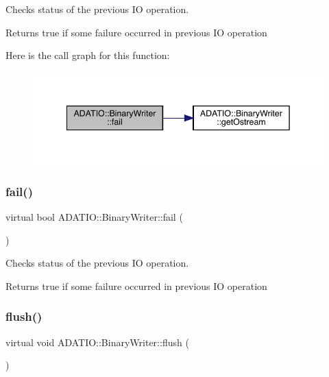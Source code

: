 Checks status of the previous IO operation. 

\begin{DoxyReturn}{Returns}
true if some failure occurred in previous IO operation 
\end{DoxyReturn}
Here is the call graph for this function\+:\nopagebreak
\begin{figure}[H]
\begin{center}
\leavevmode
\includegraphics[width=342pt]{db/dee/classADATIO_1_1BinaryWriter_a68812ccfcedfce8b5459b1327e9b03cb_cgraph}
\end{center}
\end{figure}
\mbox{\label{classADATIO_1_1BinaryWriter_af549adfdbe2c671008ad58952b34b06e}} 
\subsubsection{\texorpdfstring{fail()}{fail()}\hspace{0.1cm}{\footnotesize\ttfamily [2/2]}}
{\footnotesize\ttfamily virtual bool A\+D\+A\+T\+I\+O\+::\+Binary\+Writer\+::fail (\begin{DoxyParamCaption}{ }\end{DoxyParamCaption})\hspace{0.3cm}{\ttfamily [virtual]}}



Checks status of the previous IO operation. 

\begin{DoxyReturn}{Returns}
true if some failure occurred in previous IO operation 
\end{DoxyReturn}
\mbox{\label{classADATIO_1_1BinaryWriter_a1d335eeed64094b8641f3ebf731c981e}} 
\subsubsection{\texorpdfstring{flush()}{flush()}\hspace{0.1cm}{\footnotesize\ttfamily [1/2]}}
{\footnotesize\ttfamily virtual void A\+D\+A\+T\+I\+O\+::\+Binary\+Writer\+::flush (\begin{DoxyParamCaption}{ }\end{DoxyParamCaption})\hspace{0.3cm}{\ttfamily [pure virtual]}}



